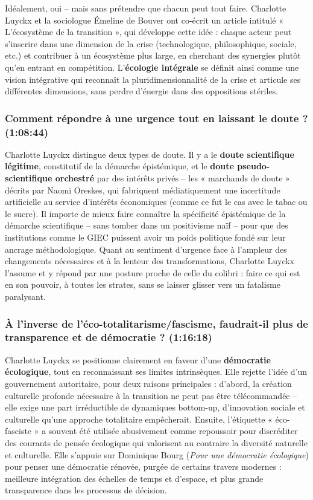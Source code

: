 Idéalement, oui -- mais sans prétendre que chacun peut tout faire. Charlotte Luyckx et la sociologue Émeline de Bouver ont co-écrit un article intitulé « L'écosystème de la transition », qui développe cette idée : chaque acteur peut s'inscrire dans une dimension de la crise (technologique, philosophique, sociale, etc.) et contribuer à un écosystème plus large, en cherchant des synergies plutôt qu'en entrant en compétition. L'\textbf{écologie intégrale} se définit ainsi comme une vision intégrative qui reconnaît la pluridimensionnalité de la crise et articule ses différentes dimensions, sans perdre d'énergie dans des oppositions stériles.

\subsubsection{Comment répondre à une urgence tout en laissant le doute ? \textnormal{\small(1:08:44)}}

Charlotte Luyckx distingue deux types de doute. Il y a le \textbf{doute scientifique légitime}, constitutif de la démarche épistémique, et le \textbf{doute pseudo-scientifique orchestré} par des intérêts privés -- les « marchands de doute » décrits par Naomi Oreskes, qui fabriquent médiatiquement une incertitude artificielle au service d'intérêts économiques (comme ce fut le cas avec le tabac ou le sucre). Il importe de mieux faire connaître la spécificité épistémique de la démarche scientifique -- sans tomber dans un positivisme naïf -- pour que des institutions comme le GIEC puissent avoir un poids politique fondé sur leur ancrage méthodologique. Quant au sentiment d'urgence face à l'ampleur des changements nécessaires et à la lenteur des transformations, Charlotte Luyckx l'assume et y répond par une posture proche de celle du colibri : faire ce qui est en son pouvoir, à toutes les strates, sans se laisser glisser vers un fatalisme paralysant.

\subsubsection{À l'inverse de l'éco-totalitarisme/fascisme, faudrait-il plus de transparence et de démocratie ? \textnormal{\small(1:16:18)}}

Charlotte Luyckx se positionne clairement en faveur d'une \textbf{démocratie écologique}, tout en reconnaissant ses limites intrinsèques. Elle rejette l'idée d'un gouvernement autoritaire, pour deux raisons principales : d'abord, la création culturelle profonde nécessaire à la transition ne peut pas être télécommandée -- elle exige une part irréductible de dynamiques bottom-up, d'innovation sociale et culturelle qu'une approche totalitaire empêcherait. Ensuite, l'étiquette « éco-fasciste » a souvent été utilisée abusivement comme repoussoir pour discréditer des courants de pensée écologique qui valorisent au contraire la diversité naturelle et culturelle. Elle s'appuie sur Dominique Bourg (\textit{Pour une démocratie écologique}) pour penser une démocratie rénovée, purgée de certains travers modernes : meilleure intégration des échelles de temps et d'espace, et plus grande transparence dans les processus de décision.

